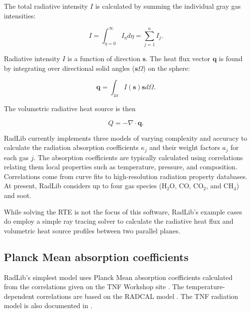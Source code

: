 \documentclass[preprint,12pt]{elsarticle}
\newcounter{bla}
\begin{document}
The total radiative intensity $I$ is calculated by summing the individual gray gas intensities:
%
\begin{linenomath}
\begin{equation}
	I=\int_{\eta=0}^{\infty}I_{\eta}d\eta=\sum_{j=1}^n I_j.
\end{equation}
\end{linenomath}
%
Radiative intensity $I$ is a function of direction $\mathbf{s}$. The heat flux vector $\mathbf{q}$ is found by integrating over directional solid angles ($\mathbf{s}\Omega$) on the sphere:
%
\begin{linenomath}
\begin{equation}
    \mathbf{q} = \int_{4\pi}I(\mathbf{s})\mathbf{s}d\Omega.
\end{equation}
\end{linenomath}
%
The volumetric radiative heat source is then 
%
\begin{linenomath}
\begin{equation}
    Q = -\nabla\cdot\mathbf{q}.
\end{equation}
\end{linenomath}
%

RadLib currently implements three models of varying complexity and accuracy to calculate the radiation absorption coefficients $\kappa_j$ and their weight factors $a_j$ for each gas $j$. The absorption coefficients are typically calculated using correlations relating them local properties such as temperature, pressure, and composition. Correlations come from curve fits to high-resolution radiation property databases. At present, RadLib considers up to four gas species (H$_2$O, CO, CO$_2$, and CH$_4$) and soot. 

While solving the RTE is not the focus of this software, RadLib's example cases do employ a simple ray tracing solver to calculate the radiative heat flux and volumetric heat source profiles between two parallel planes. 



\subsection{Planck Mean absorption coefficients} \label{s:planckmean}

RadLib's simplest model uses Planck Mean absorption coefficients calculated from the correlations given on the TNF Workshop site \citep{Smith_2003}. The temperature-dependent correlations are based on the RADCAL model \citep{Grosshandler_1993}. The TNF radiation model is also documented in \citep{Barlow_2001}.
\end{document}
